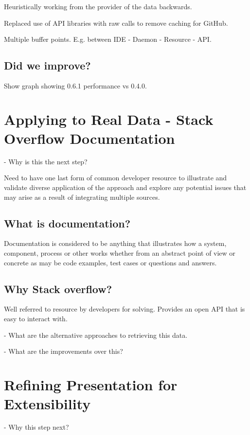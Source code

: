 Heuristically working from the provider of the data backwards.

Replaced use of API libraries with raw calls to remove caching for GitHub.

Multiple buffer points. E.g. between IDE - Daemon - Resource - API.

\subsection{Did we improve?}

Show graph showing 0.6.1 performance vs 0.4.0.

\section{Applying to Real Data - Stack Overflow Documentation}

- Why is this the next step?

Need to have one last form of common developer resource to illustrate and validate diverse application of the approach and explore any potential issues that may arise as a result of integrating multiple sources.

\subsection{What is documentation?}

Documentation is considered to be anything that illustrates how a system, component, process or other works whether from an abstract point of view or concrete as may be code examples, test cases or questions and answers.

\subsection{Why Stack overflow?}

Well referred to resource by developers for solving. Provides an open API that is easy to interact with.

- What are the alternative approaches to retrieving this data.

- What are the improvements over this?

\section{Refining Presentation for Extensibility}

- Why this step next?

